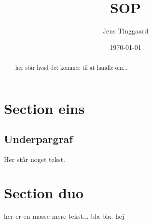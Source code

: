 \documentclass[a4paper, 12pt]{article}
\date{\today}
\title{SOP}
\author{Jens Tinggaard}
\begin{document}
\clearpage\maketitle
\thispagestyle{empty}
\maketitle
\begin{abstract}
her står hvad det kommer til at handle om...
\end{abstract}

\newpage
\tableofcontents

\newpage
\section{Section eins}
\newpage
\subsection{Underpargraf}

Her står noget tekst.
\newpage
\section{Section duo}
her er en masse mere tekst...
bla bla.
\newpage
hej
\end{document}

